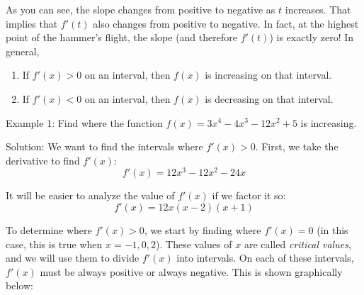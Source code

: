 
As you can see, the slope changes from positive to negative as $t$ increases. That implies that $f'(t)$ also changes from positive to negative. In fact, at the highest point of the hammer's flight, the slope (and therefore $f'(t)$) is exactly zero! In general, 
\begin{enumerate}
\item If $f'(x)>0$ on an interval, then $f(x)$ is increasing on that interval.
\item If $f'(x)<0$ on an interval, then $f(x)$ is decreasing on that interval. 
\end{enumerate}

Example 1: Find where the function $f(x) = 3x^4-4x^3-12x^2+5$ is increasing. 

Solution: We want to find the intervals where $f'(x)>0$. First, we take the derivative to find $f'(x)$:
$$f'(x) = 12x^3-12x^2-24x$$

It will be easier to analyze the value of $f'(x)$ if we factor it so:
$$f'(x) = 12x(x-2)(x+1)$$

To determine where $f'(x)>0$, we start by finding where $f'(x)=0$ (in this case, this is true when $x=-1, 0, 2$). These values of $x$ are called \textit{critical values}, and we will use them to divide $f'(x)$ into intervals. On each of these intervals, $f'(x)$ must be always positive or always negative. This is shown graphically below:


